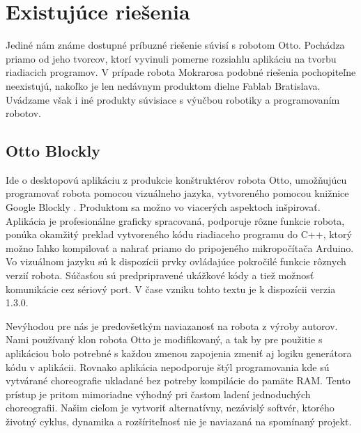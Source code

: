 \section{Existujúce riešenia}
Jediné nám známe dostupné príbuzné riešenie súvisí s robotom Otto. Pochádza priamo od jeho tvorcov, ktorí vyvinuli pomerne rozsiahlu aplikáciu na tvorbu riadiacich programov. V prípade robota Mokrarosa podobné riešenia pochopiteľne neexistujú, nakoľko je len nedávnym produktom dielne Fablab Bratislava. Uvádzame však i iné produkty súvisiace s výučbou robotiky a programovaním robotov.

\subsection{Otto Blockly}
\label{sub:OttoBlockly}
Ide o desktopovú aplikáciu z produkcie konštruktérov robota Otto, umožňujúcu programovať robota pomocou vizuálneho jazyka, vytvoreného pomocou knižnice Google Blockly \cite{OttoBlockly}. Produktom sa možno vo viacerých aspektoch inšpirovať. Aplikácia je profesionálne graficky spracovaná, podporuje rôzne funkcie robota, ponúka okamžitý preklad vytvoreného kódu riadiaceho programu do C++, ktorý možno ľahko kompilovať a nahrať priamo do pripojeného mikropočítača Arduino. Vo vizuálnom jazyku sú k dispozícii prvky ovládajúce pokročilé funkcie rôznych verzií robota. Súčasťou sú predpripravené ukážkové kódy a tiež možnosť komunikácie cez sériový port. V čase vzniku tohto textu je k dispozícii verzia 1.3.0.

Nevýhodou pre nás je predovšetkým naviazanosť na robota z výroby autorov. Nami používaný klon robota Otto je modifikovaný, a tak by pre použitie s aplikáciou bolo potrebné s každou zmenou zapojenia zmeniť aj logiku generátora kódu v aplikácii. Rovnako aplikácia nepodporuje štýl programovania kde sú vytvárané choreografie ukladané bez potreby kompilácie do pamäte RAM. Tento prístup je pritom mimoriadne výhodný pri častom ladení jednoduchých choreografii. Našim cieľom je vytvoriť alternatívny, nezávislý softvér, ktorého životný cyklus, dynamika a rozšíriteľnosť nie je naviazaná na spomínaný projekt.

